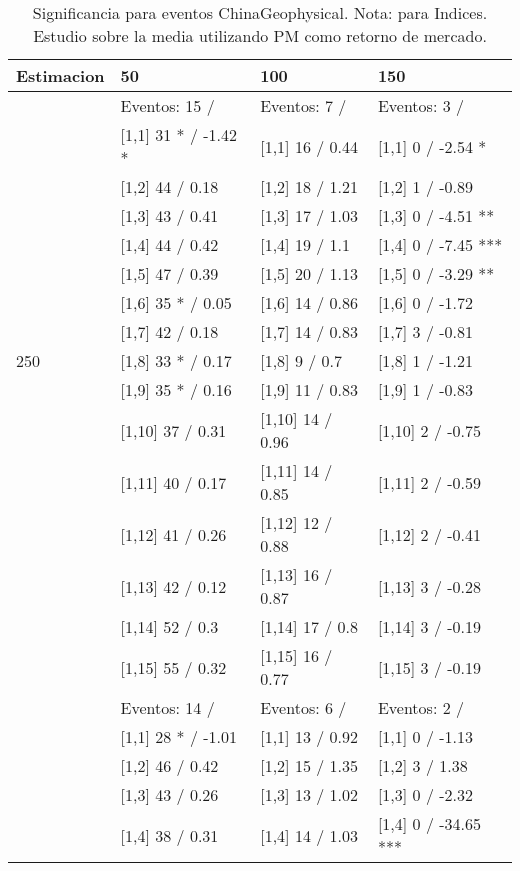 \begin{table}

\caption{Significancia para eventos ChinaGeophysical. Nota: para Indices. Estudio sobre la media utilizando PM como retorno de mercado.}
\centering
\begin{tabular}[t]{llll}
\toprule
Estimacion & 50 & 100 & 150\\
\midrule
 & Eventos:  15 / & Eventos:  7 / & Eventos:  3 /\\
 & {}[1,1] 31 * / -1.42 * & {}[1,1] 16  / 0.44 & {}[1,1] 0  / -2.54 *\\
 & {}[1,2] 44  / 0.18 & {}[1,2] 18  / 1.21 & {}[1,2] 1  / -0.89\\
 & {}[1,3] 43  / 0.41 & {}[1,3] 17  / 1.03 & {}[1,3] 0  / -4.51 **\\
 & {}[1,4] 44  / 0.42 & {}[1,4] 19  / 1.1 & {}[1,4] 0  / -7.45 ***\\
\addlinespace
 & {}[1,5] 47  / 0.39 & {}[1,5] 20  / 1.13 & {}[1,5] 0  / -3.29 **\\
 & {}[1,6] 35 * / 0.05 & {}[1,6] 14  / 0.86 & {}[1,6] 0  / -1.72\\
 & {}[1,7] 42  / 0.18 & {}[1,7] 14  / 0.83 & {}[1,7] 3  / -0.81\\
250 & {}[1,8] 33 * / 0.17 & {}[1,8] 9  / 0.7 & {}[1,8] 1  / -1.21\\
 & {}[1,9] 35 * / 0.16 & {}[1,9] 11  / 0.83 & {}[1,9] 1  / -0.83\\
\addlinespace
 & {}[1,10] 37  / 0.31 & {}[1,10] 14  / 0.96 & {}[1,10] 2  / -0.75\\
 & {}[1,11] 40  / 0.17 & {}[1,11] 14  / 0.85 & {}[1,11] 2  / -0.59\\
 & {}[1,12] 41  / 0.26 & {}[1,12] 12  / 0.88 & {}[1,12] 2  / -0.41\\
 & {}[1,13] 42  / 0.12 & {}[1,13] 16  / 0.87 & {}[1,13] 3  / -0.28\\
 & {}[1,14] 52  / 0.3 & {}[1,14] 17  / 0.8 & {}[1,14] 3  / -0.19\\
\addlinespace
 & {}[1,15] 55  / 0.32 & {}[1,15] 16  / 0.77 & {}[1,15] 3  / -0.19\\
 & Eventos:  14 / & Eventos:  6 / & Eventos:  2 /\\
 & {}[1,1] 28 * / -1.01 & {}[1,1] 13  / 0.92 & {}[1,1] 0  / -1.13\\
 & {}[1,2] 46  / 0.42 & {}[1,2] 15  / 1.35 & {}[1,2] 3  / 1.38\\
 & {}[1,3] 43  / 0.26 & {}[1,3] 13  / 1.02 & {}[1,3] 0  / -2.32\\
\addlinespace
 & {}[1,4] 38  / 0.31 & {}[1,4] 14  / 1.03 & {}[1,4] 0  / -34.65 ***\\

\end{tabular}
\end{table}
